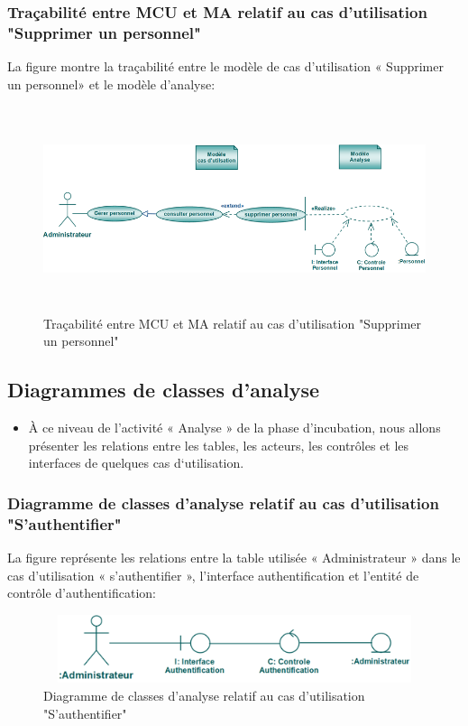 \documentclass[12 pt]{report}
\begin{document}
\subsubsection{Traçabilité entre MCU et MA relatif au cas d’utilisation "Supprimer un personnel" }
La figure  montre la traçabilité entre le modèle de cas d’utilisation « Supprimer un personnel» et le modèle
d’analyse:
\begin{figure}[h]
\begin{center}
\includegraphics[width= 14cm , height =6cm]{tracsupp.png}
\caption{Traçabilité entre MCU et MA relatif au cas d’utilisation "Supprimer un personnel" }
\end{center}
\end{figure} 
\newpage
\subsection{Diagrammes de classes d'analyse}
\begin{itemize}[font=\color{black} \Large, label=] 
\item À ce niveau de l’activité « Analyse » de la phase d’incubation, nous allons présenter les relations entre les tables, les acteurs, les contrôles et les interfaces de quelques cas d‘utilisation.
\end{itemize}
\subsubsection{Diagramme de classes d’analyse relatif au cas d’utilisation "S’authentifier" }
La figure  représente les relations entre la table utilisée « Administrateur » dans le cas d’utilisation « s'authentifier », l’interface  authentification et  l'entité de  contrôle d'authentification:
\begin{figure}[h]
\begin{center}
\includegraphics[width= 12cm , height =2cm]{classid.png}
\caption{Diagramme de classes d’analyse relatif au cas d’utilisation "S’authentifier"}
\end{center}
\end{figure}
\end{document}
